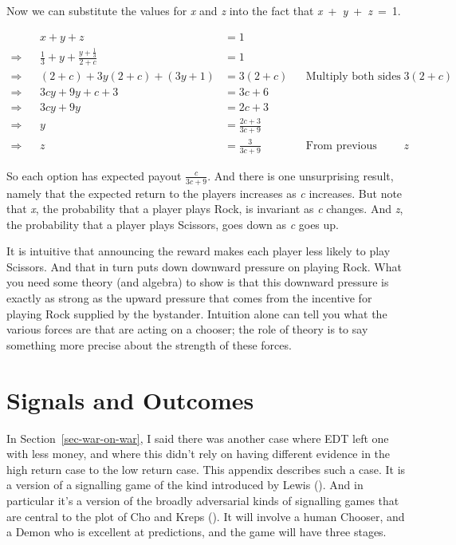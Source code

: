 \documentclass[
  12pt,
  letterpaper,
  DIV=11,
  numbers=noendperiod]{scrreprt}
\begin{document}
Now we can substitute the values for \emph{x} and \emph{z} into the fact
that \emph{x}~+~\emph{y}~+~\emph{z}~=~1.

\begin{align*}
&& x + y + z &= 1  && \\
\Rightarrow && \frac{1}{3} + y + \frac{y + \frac{1}{3}}{2 + c} &= 1 && \\
\Rightarrow && (2+c) + 3y(2+c) + (3y+1) &= 3(2+c) && \text{Multiply both sides by } 3(2+c) \\
\Rightarrow && 3cy + 9y + c + 3 &= 3c + 6 \\
\Rightarrow && 3cy + 9y &= 2c + 3 \\
\Rightarrow && y &= \frac{2c + 3}{3c + 9} \\
\Rightarrow && z &= \frac{3}{3c + 9} && \text{From previous derivation for }z
\end{align*}

So each option has expected payout \(\frac{c}{3c+9}\). And there is one
unsurprising result, namely that the expected return to the players
increases as \emph{c} increases. But note that \emph{x}, the probability
that a player plays Rock, is invariant as \emph{c} changes. And
\emph{z}, the probability that a player plays Scissors, goes down as
\emph{c} goes up.

It is intuitive that announcing the reward makes each player less likely
to play Scissors. And that in turn puts down downward pressure on
playing Rock. What you need some theory (and algebra) to show is that
this downward pressure is exactly as strong as the upward pressure that
comes from the incentive for playing Rock supplied by the bystander.
Intuition alone can tell you what the various forces are that are acting
on a chooser; the role of theory is to say something more precise about
the strength of these forces.

\chapter{Signals and Outcomes}\label{sec-war-signal}

In Section~\ref{sec-war-on-war}, I said there was another case where EDT
left one with less money, and where this didn't rely on having different
evidence in the high return case to the low return case. This appendix
describes such a case. It is a version of a signalling game of the kind
introduced by Lewis (). And in particular
it's a version of the broadly adversarial kinds of signalling games that
are central to the plot of Cho and Kreps
(). It will involve a human Chooser,
and a Demon who is excellent at predictions, and the game will have
three stages.
\end{document}
